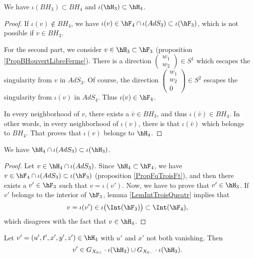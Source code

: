 \begin{corollary}		\label{CorBHBHHHHH}
	We have $\iota(BH_3)\subset BH_4$ and $\iota(\hH_3)\subset \hH_4$.
\end{corollary}

\begin{proof}
	If $\iota(v)\notin BH_4$, we have $\iota(v)\in \hF_4\cap\iota(AdS_3)\subset\iota(\hF_3)$, which is not possible if $v\in BH_3$.

	For the second part, we consider $v\in\hH_3\subset\hF_3$ (proposition \ref{PropBHouvertLibreFerme}). There is a direction $\begin{pmatrix}
		w_1	\\ 
		w_2	
	\end{pmatrix}\in S^1$ which escapes the singularity from $v$ in $AdS_3$. Of course, the direction $\begin{pmatrix}
		w_1	\\ 
		w_2	\\ 
		0
	\end{pmatrix}\in S^2$ escapes the singularity from $\iota(v)$ in $AdS_4$. Thus $\iota(v)\in\hF_4$.

	In every neighborhood of $v$, there exists a $\bar v\in BH_3$, and thus $\iota(\bar v)\in BH_4$. In other words, in every neighborhood of $\iota(v)$, there is that $\iota(\bar v)$ which belongs to $BH_4$. That proves that $\iota(v)$ belongs to $\hH_4$.
\end{proof}

\begin{lemma}		\label{LemHinteridansH}
	We have $\hH_4\cap\iota(AdS_3)\subset\iota(\hH_3)$.
\end{lemma}

\begin{proof}
	Let $v\in\hH_4\cap\iota(AdS_3)$. Since $\hH_4\subset\hF_4$, we have $v\in\hF_4\cap\iota(AdS_3)\subset\iota(\hF_3)$ (proposition \ref{PropFqTroisFt}), and then there exists a $v'\in\hF_3$ such that $v=\iota(v')$. Now, we have to prove that $v'\in\hH_3$. If $v'$ belongs to the interior of $\hF_3$, lemma \ref{LemIntTroisQueatr} implies that
	\begin{equation}
		v=\iota(v')\in\iota\big( \Int(\hF_3) \big)\subset\Int(\hF_4),
	\end{equation}
	which disagrees with the fact that $v\in\hH_4$.
\end{proof}

\begin{proposition}		\label{PropovHhnonXYzero}
	Let $v'=(u',t',x',y',z')\in\hH_4$ with $u'$ and $x'$ not both vanishing. Then
	\begin{equation}
		v'\in G_{X_{0+}}\cdot \iota(\hH_3)\cup G_{X_{0-}}\cdot \iota(\hH_3).
	\end{equation}
\end{proposition}

